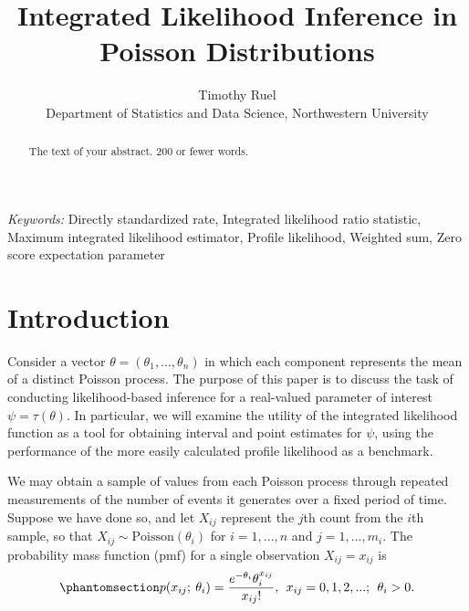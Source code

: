 \documentclass[
  12pt]{article}
\begin{document}
\def\spacingset#1{\renewcommand{\baselinestretch}%
{#1}\small\normalsize} \spacingset{1}



\title{\bf Integrated Likelihood Inference in Poisson Distributions}
\author{
Timothy Ruel\\
Department of Statistics and Data Science, Northwestern University\\
}
\maketitle

\bigskip
\bigskip
\begin{abstract}
The text of your abstract. 200 or fewer words.
\end{abstract}

\noindent%
{\it Keywords:} Directly standardized rate, Integrated likelihood ratio
statistic, Maximum integrated likelihood estimator, Profile
likelihood, Weighted sum, Zero score expectation parameter
\vfill

\newpage
\spacingset{1.9} %

\section{Introduction}\label{sec-intro}

Consider a vector \(\theta = (\theta_1, ..., \theta_n)\) in which each
component represents the mean of a distinct Poisson process. The purpose
of this paper is to discuss the task of conducting likelihood-based
inference for a real-valued parameter of interest
\(\psi = \tau(\theta)\). In particular, we will examine the utility of
the integrated likelihood function as a tool for obtaining interval and
point estimates for \(\psi\), using the performance of the more easily
calculated profile likelihood as a benchmark.

We may obtain a sample of values from each Poisson process through
repeated measurements of the number of events it generates over a fixed
period of time. Suppose we have done so, and let \(X_{ij}\) represent
the \(j\)th count from the \(i\)th sample, so that
\(X_{ij} \sim \text{Poisson}(\theta_i)\) for \(i = 1, ..., n\) and
\(j = 1, ..., m_i.\) The probability mass function (pmf) for a single
observation \(X_{ij} = x_{ij}\) is
\begin{equation}\phantomsection\label{eq-1}{
p(x_{ij}; \> \theta_i) = \frac{e^{-\theta_i} \theta_i ^ {x_{ij}}}{x_{ij}!}, \> \> x_{ij} = 0, 1, 2, ... ; \> \> \theta_i > 0.
}\end{equation}
\end{document}
